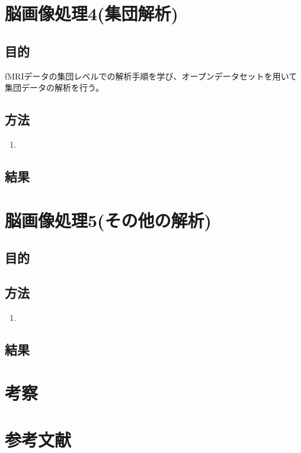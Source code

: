 \documentclass{jlreq}
\begin{document}
\section{脳画像処理4(集団解析)}
\subsection{目的}
fMRIデータの集団レベルでの解析手順を学び、オープンデータセットを用いて集団データの解析を行う。

\subsection{方法}
\begin{enumerate}
    \item 
\end{enumerate}
\subsection{結果}

\section{脳画像処理5(その他の解析)}
\subsection{目的}

\subsection{方法}
\begin{enumerate}
    \item 
\end{enumerate}
\subsection{結果}



\section{考察}



\section*{参考文献}
\end{document}
